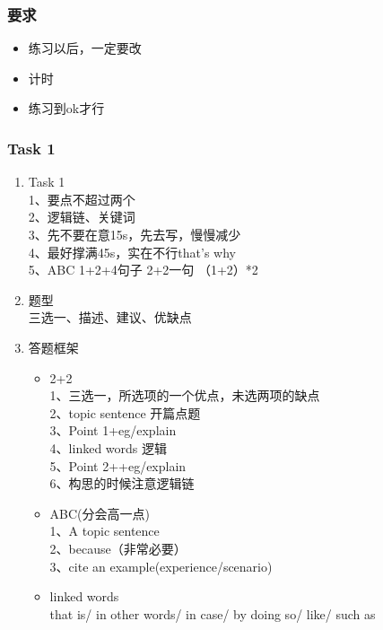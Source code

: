 \documentclass[UTF8]{ctexart}
\begin{document}
\subsubsection{要求}
\begin{itemize}
  \item 练习以后，一定要改
  \item 计时
  \item 练习到ok才行
\end{itemize}
\subsubsection{Task 1}
\begin{enumerate}[A]
  \item Task 1\\
  1、要点不超过两个\\
  2、逻辑链、关键词\\
  3、先不要在意15s，先去写，慢慢减少\\
  4、最好撑满45s，实在不行that's why\\
  5、ABC 1+2+4句子 2+2一句 （1+2）*2\\
  \item 题型\\
    三选一、描述、建议、优缺点\\
  \item 答题框架\\
  \begin{itemize}
    \item 2+2\\
    1、三选一，所选项的一个优点，未选两项的缺点\\
    2、topic sentence 开篇点题\\
    3、Point 1+eg/explain\\
    4、linked words 逻辑\\
    5、Point 2++eg/explain\\
    6、构思的时候注意逻辑链\\
    \item ABC(分会高一点)\\
    1、A topic sentence\\
    2、because（非常必要）\\
    3、cite an example(experience/scenario)\\
    \item linked words\\
    that is/ in other words/ in case/ by doing so/ like/ such as
  \end{itemize}
\end{enumerate}
\end{document}
